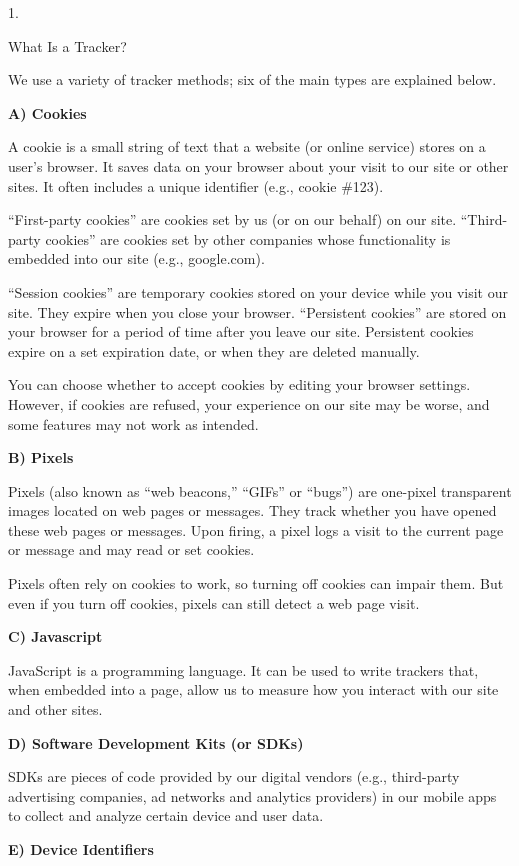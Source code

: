 1.

What Is a Tracker?

We use a variety of tracker methods; six of the main types are explained
below.

\textbf{A) Cookies}

A cookie is a small string of text that a website (or online service)
stores on a user's browser. It saves data on your browser about your
visit to our site or other sites. It often includes a unique identifier
(e.g., cookie \#123).

``First-party cookies'' are cookies set by us (or on our behalf) on our
site. ``Third-party cookies'' are cookies set by other companies whose
functionality is embedded into our site (e.g., google.com).

``Session cookies'' are temporary cookies stored on your device while
you visit our site. They expire when you close your browser.
``Persistent cookies'' are stored on your browser for a period of time
after you leave our site. Persistent cookies expire on a set expiration
date, or when they are deleted manually.

You can choose whether to accept cookies by editing your browser
settings. However, if cookies are refused, your experience on our site
may be worse, and some features may not work as intended.

\textbf{B) Pixels}

Pixels (also known as ``web beacons,'' ``GIFs'' or ``bugs'') are
one-pixel transparent images located on web pages or messages. They
track whether you have opened these web pages or messages. Upon firing,
a pixel logs a visit to the current page or message and may read or set
cookies.

Pixels often rely on cookies to work, so turning off cookies can impair
them. But even if you turn off cookies, pixels can still detect a web
page visit.

\textbf{C) Javascript}

JavaScript is a programming language. It can be used to write trackers
that, when embedded into a page, allow us to measure how you interact
with our site and other sites.

\textbf{D) Software Development Kits (or SDKs)}

SDKs are pieces of code provided by our digital vendors (e.g.,
third-party advertising companies, ad networks and analytics providers)
in our mobile apps to collect and analyze certain device and user data.

\textbf{E) Device Identifiers}

